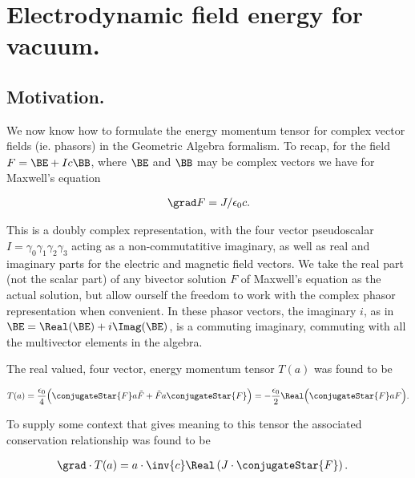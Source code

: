 

\chapter{Electrodynamic field energy for vacuum.}
\label{chap:fourierMaxVac}
{}
\date{Dec 16, 2009}

\beginArtWithToc

\section{Motivation.}

We now know how to formulate the energy momentum tensor for complex vector fields (ie. phasors) in the Geometric Algebra formalism.  To recap, for the field $F = \BE + I c \BB$, where $\BE$ and $\BB$ may be complex vectors we have for Maxwell's equation

\begin{align}\label{eqn:fourierMaxVac:1}
\grad F = J/\epsilon_0 c.
\end{align}

This is a doubly complex representation, with the four vector pseudoscalar $I = \gamma_0 \gamma_1 \gamma_2 \gamma_3$ acting as a non-commutatitive imaginary, as well as real and imaginary parts for the electric and magnetic field vectors.  We take the real part (not the scalar part) of any bivector solution $F$ of Maxwell's equation as the actual solution, but allow ourself the freedom to work with the complex phasor representation when convenient.  In these phasor vectors, the imaginary $i$, as in $\BE = \Real(\BE) + i \Imag(\BE)$, is a commuting imaginary, commuting with all the multivector elements in the algebra.

The real valued, four vector, energy momentum tensor $T(a)$ was found to be

\begin{align}\label{eqn:fourierMaxVac:2}
T(a) = \frac{\epsilon_0}{4} \Bigl( \conjugateStar{F} a \tilde{F} + \tilde{F} a \conjugateStar{F} \Bigr) = 
-\frac{\epsilon_0}{2} \Real \Bigl( \conjugateStar{F} a F \Bigr).
\end{align}

To supply some context that gives meaning to this tensor the associated conservation relationship was found to be

\begin{align}\label{eqn:fourierMaxVac:3}
\grad \cdot T(a) &= a \cdot \inv{ c } \Real \left( J \cdot \conjugateStar{F} \right).
\end{align}

